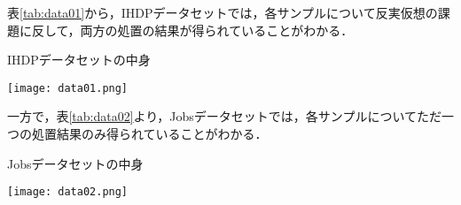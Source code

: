 \documentclass[dvipdfmx]{jreport}
\begin{document}
表\ref{tab:data01}から，IHDPデータセットでは，各サンプルについて反実仮想の課題に反して，両方の処置の結果が得られていることがわかる．
\begin{table}[h]
    \caption{IHDPデータセットの中身} \label{tab:data01}
    \begin{center}
        \texttt{[image: data01.png]}
    \end{center}
\end{table}
一方で，表\ref{tab:data02}より，Jobsデータセットでは，各サンプルについてただ一つの処置結果のみ得られていることがわかる．
\begin{table}[h]
    \caption{Jobsデータセットの中身} \label{tab:data02}
    \begin{center}
        \texttt{[image: data02.png]}
    \end{center}
\end{table}

\end{document}
